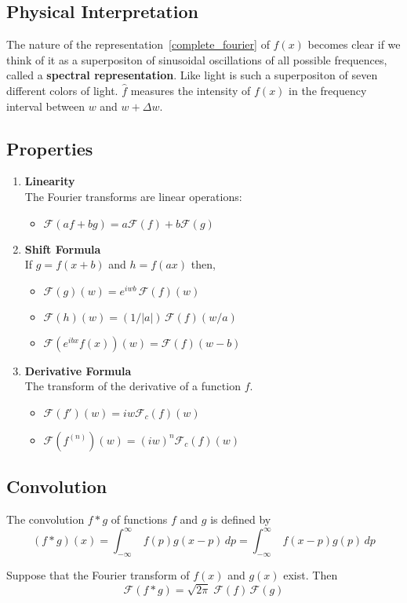 \message{ !name(ch3_aima331.tex)}\documentclass[aima331_lecturenotes_ku.tex]{subfiles}
\begin{document}
 \subsection{Physical Interpretation}
 The nature of the representation~\ref{complete_fourier} of $f(x)$ becomes clear if we think of it as a superpositon of sinusoidal oscillations of all possible frequences, called a \textbf{spectral representation}. Like light is such a superpositon of seven different colors of light. $\hat{f}$ measures the intensity of $f(x)$ in the frequency interval between $w$ and $w+\Delta w$.

 \subsection{Properties}
 \begin{enumerate}
 \item \textbf{Linearity} \\[1mm]
   The Fourier transforms are linear operations:
  \begin{itemize}
  \item $\mathcal{F} (af+bg)=a\mathcal{F}(f) + b \mathcal{F}(g)$
   \end{itemize}

 \item \textbf{Shift Formula} \\[1mm]
   If $g=f(x+b)$ and $h=f(ax)$ then,
   \begin{itemize}
   \item $\mathcal{F}(g)(w)= e^{iwb} \, \mathcal{F}(f)(w)$
   \item $\mathcal{F}(h)(w)= (1/|a|) \, \mathcal{F}(f)(w/a)$
    \item $\mathcal{F}(e^{ibx}f(x))(w)=  \mathcal{F}(f)(w-b)$
   \end{itemize}

 \item \textbf{Derivative Formula} \\[1mm]
   The transform of the derivative of a function $f$.
   \begin{itemize}
   \item $\displaystyle \mathcal{F}(f')(w)=iw\mathcal{F}_c(f)(w)$
    \item $\displaystyle \mathcal{F}(f^{(n)})(w)=(iw)^n\mathcal{F}_c(f)(w)$
   \end{itemize}
 \end{enumerate}

 \subsection{Convolution}
 The convolution $f * g$ of functions $f$ and $g$ is defined by
 \begin{equation}
   \label{conv}
   (f*g)(x) = \int_{-\infty}^{\infty} \; f(p)g(x-p)\,dp = \int_{-\infty}^{\infty} \; f(x-p)g(p)\,dp
 \end{equation}
 \begin{theorem}
   Suppose that the Fourier transform of $f(x)$ and $g(x)$ exist. Then
   \begin{equation}
     \label{conv_theorem}
     \mathcal{F}(f*g)=\sqrt{2 \pi}\; \mathcal{F}(f)\,\mathcal{F}(g)
   \end{equation}
 \end{theorem}
\end{document}
